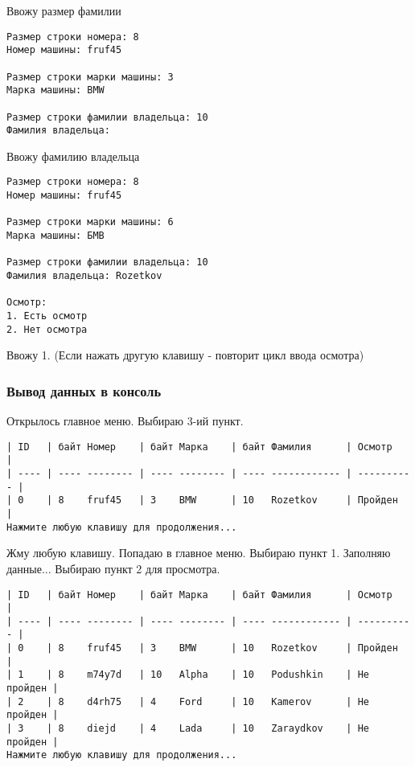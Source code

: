Ввожу размер фамилии

\begin{tcolorbox}
\begin{verbatim}
Размер строки номера: 8
Номер машины: fruf45

Размер строки марки машины: 3
Марка машины: BMW

Размер строки фамилии владельца: 10
Фамилия владельца:
\end{verbatim}
\end{tcolorbox}

Ввожу фамилию владельца

\begin{tcolorbox}
\begin{verbatim}
Размер строки номера: 8
Номер машины: fruf45

Размер строки марки машины: 6
Марка машины: БМВ

Размер строки фамилии владельца: 10
Фамилия владельца: Rozetkov

Осмотр:       
1. Есть осмотр
2. Нет осмотра
\end{verbatim}
\end{tcolorbox}

Ввожу 1. (Если нажать другую клавишу - повторит цикл ввода осмотра)

\subsubsection{Вывод данных в консоль}

Открылось главное меню. Выбираю 3-ий пункт.

\begin{tcolorbox}
\begin{verbatim}
| ID   | байт Номер    | байт Марка    | байт Фамилия      | Осмотр     |
| ---- | ---- -------- | ---- -------- | ---- ------------ | ---------- |
| 0    | 8    fruf45   | 3    BMW      | 10   Rozetkov     | Пройден    |
Нажмите любую клавишу для продолжения...
\end{verbatim}
\end{tcolorbox}

Жму любую клавишу. Попадаю в главное меню. Выбираю пункт 1. Заполняю данные... Выбираю пункт 2 для просмотра.

\begin{tcolorbox}
\begin{verbatim}
| ID   | байт Номер    | байт Марка    | байт Фамилия      | Осмотр     |
| ---- | ---- -------- | ---- -------- | ---- ------------ | ---------- |
| 0    | 8    fruf45   | 3    BMW      | 10   Rozetkov     | Пройден    |
| 1    | 8    m74y7d   | 10   Alpha    | 10   Podushkin    | Не пройден |
| 2    | 8    d4rh75   | 4    Ford     | 10   Kamerov      | Не пройден |
| 3    | 8    diejd    | 4    Lada     | 10   Zaraydkov    | Не пройден |
Нажмите любую клавишу для продолжения...
\end{verbatim}
\end{tcolorbox}

